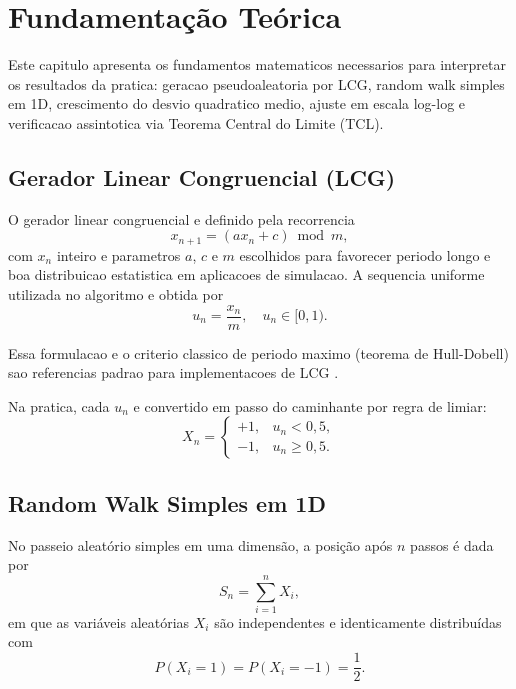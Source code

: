
\chapter{Fundamentação Teórica}
\label{chap_fundamentacao_teorica}

Este capitulo apresenta os fundamentos matematicos necessarios para interpretar os resultados da pratica: geracao pseudoaleatoria por LCG, random walk simples em 1D, crescimento do desvio quadratico medio, ajuste em escala log-log e verificacao assintotica via Teorema Central do Limite (TCL).

\section{Gerador Linear Congruencial (LCG)}

O gerador linear congruencial e definido pela recorrencia
\begin{equation}
x_{n+1} = (a x_n + c) \bmod m,
\end{equation}
com $x_n$ inteiro e parametros $a$, $c$ e $m$ escolhidos para favorecer periodo longo e boa distribuicao estatistica em aplicacoes de simulacao. A sequencia uniforme utilizada no algoritmo e obtida por
\begin{equation}
u_n = \frac{x_n}{m}, \quad u_n \in [0,1).
\end{equation}

Essa formulacao e o criterio classico de periodo maximo (teorema de Hull-Dobell) sao referencias padrao para implementacoes de LCG \cite{hull_dobell_1962}.

Na pratica, cada $u_n$ e convertido em passo do caminhante por regra de limiar:
\begin{equation}
X_n =
\begin{cases}
+1, & u_n < 0{,}5, \\
-1, & u_n \ge 0{,}5.
\end{cases}
\end{equation}

\section{Random Walk Simples em 1D}

No passeio aleatório simples em uma dimensão, a posição após $n$ passos é dada por
\begin{equation}
S_n = \sum_{i=1}^{n} X_i,
\end{equation}
em que as variáveis aleatórias $X_i$ são independentes e identicamente distribuídas com
\begin{equation}
P(X_i=1)=P(X_i=-1)=\frac{1}{2}.
\end{equation}

